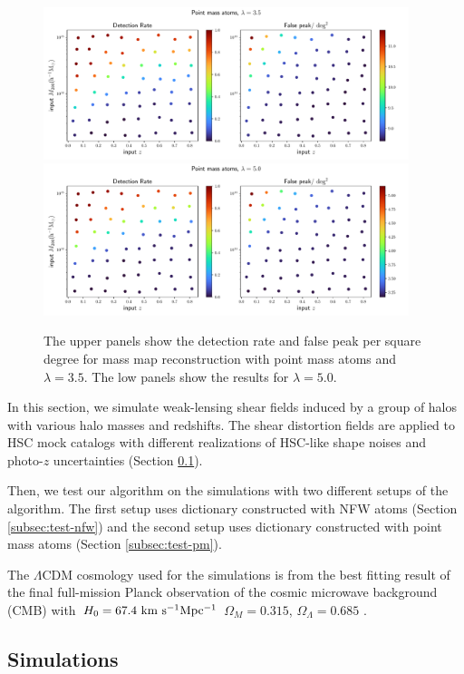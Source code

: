 \documentclass[twocolumn]{aastex62}
\begin{document}
\begin{figure}[!ht]
 \centering
 \includegraphics[width=0.95\textwidth]{detfalseRate_f1-1.pdf}
 \includegraphics[width=0.95\textwidth]{detfalseRate_f1-3.pdf}
 \caption{The upper panels show the detection rate and false peak per square degree for mass map reconstruction with
point mass atoms and $\lambda=3.5$. The low panels show the results for $\lambda=5.0$. }
\end{figure}

In this section, we simulate weak-lensing shear fields induced by a group of halos with various halo masses
and redshifts. The shear distortion fields are applied to HSC mock catalogs with different realizations of HSC-like shape
noises and photo-$z$ uncertainties (Section \ref{subsec:Sims}).

Then, we test our algorithm on the simulations with two different setups of the algorithm. The first setup uses dictionary
constructed with NFW atoms (Section \ref{subsec:test-nfw}) and the second setup uses dictionary constructed with point mass
atoms (Section \ref{subsec:test-pm}).

The $\Lambda$CDM cosmology used for the simulations is from the best fitting result of the final full-mission Planck observation
of the cosmic microwave background (CMB) with $H_0=67.4 ~\rm{km~s^{-1} Mpc^{-1}}$ $\Omega_M=0.315$, $\Omega_\Lambda=0.685$
\citep{cmb-Planck2018-Cosmology}.

\subsection{Simulations}
\label{subsec:Sims}
\end{document}
